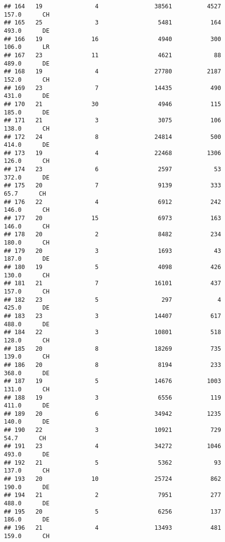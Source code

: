 \documentclass[
]{article}
\begin{document}
\begin{verbatim}
## 164   19               4                38561          4527    157.0      CH
## 165   25               3                 5481           164    493.0      DE
## 166   19              16                 4940           300    106.0      LR
## 167   23              11                 4621            88    489.0      DE
## 168   19               4                27780          2187    152.0      CH
## 169   23               7                14435           490    431.0      DE
## 170   21              30                 4946           115    185.0      DE
## 171   21               3                 3075           106    138.0      CH
## 172   24               8                24814           500    414.0      DE
## 173   19               4                22468          1306    126.0      CH
## 174   23               6                 2597            53    372.0      DE
## 175   20               7                 9139           333     65.7      CH
## 176   22               4                 6912           242    146.0      CH
## 177   20              15                 6973           163    146.0      CH
## 178   20               2                 8482           234    180.0      CH
## 179   20               3                 1693            43    187.0      DE
## 180   19               5                 4098           426    130.0      CH
## 181   21               7                16101           437    157.0      CH
## 182   23               5                  297             4    425.0      DE
## 183   23               3                14407           617    488.0      DE
## 184   22               3                10801           518    128.0      CH
## 185   20               8                18269           735    139.0      CH
## 186   20               8                 8194           233    368.0      DE
## 187   19               5                14676          1003    131.0      CH
## 188   19               3                 6556           119    411.0      DE
## 189   20               6                34942          1235    140.0      DE
## 190   22               3                10921           729     54.7      CH
## 191   23               4                34272          1046    493.0      DE
## 192   21               5                 5362            93    137.0      CH
## 193   20              10                25724           862    190.0      DE
## 194   21               2                 7951           277    488.0      DE
## 195   20               5                 6256           137    186.0      DE
## 196   21               4                13493           481    159.0      CH

\end{verbatim}
\end{document}
